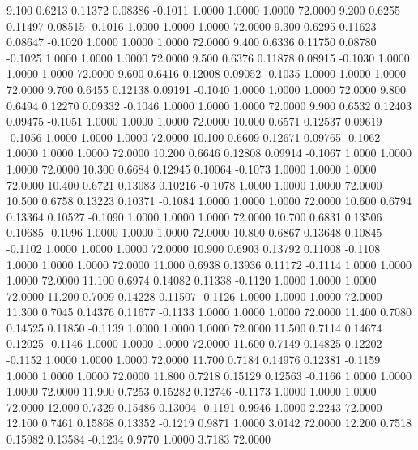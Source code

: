    9.100   0.6213   0.11372   0.08386  -0.1011   1.0000   1.0000   1.0000  72.0000
   9.200   0.6255   0.11497   0.08515  -0.1016   1.0000   1.0000   1.0000  72.0000
   9.300   0.6295   0.11623   0.08647  -0.1020   1.0000   1.0000   1.0000  72.0000
   9.400   0.6336   0.11750   0.08780  -0.1025   1.0000   1.0000   1.0000  72.0000
   9.500   0.6376   0.11878   0.08915  -0.1030   1.0000   1.0000   1.0000  72.0000
   9.600   0.6416   0.12008   0.09052  -0.1035   1.0000   1.0000   1.0000  72.0000
   9.700   0.6455   0.12138   0.09191  -0.1040   1.0000   1.0000   1.0000  72.0000
   9.800   0.6494   0.12270   0.09332  -0.1046   1.0000   1.0000   1.0000  72.0000
   9.900   0.6532   0.12403   0.09475  -0.1051   1.0000   1.0000   1.0000  72.0000
  10.000   0.6571   0.12537   0.09619  -0.1056   1.0000   1.0000   1.0000  72.0000
  10.100   0.6609   0.12671   0.09765  -0.1062   1.0000   1.0000   1.0000  72.0000
  10.200   0.6646   0.12808   0.09914  -0.1067   1.0000   1.0000   1.0000  72.0000
  10.300   0.6684   0.12945   0.10064  -0.1073   1.0000   1.0000   1.0000  72.0000
  10.400   0.6721   0.13083   0.10216  -0.1078   1.0000   1.0000   1.0000  72.0000
  10.500   0.6758   0.13223   0.10371  -0.1084   1.0000   1.0000   1.0000  72.0000
  10.600   0.6794   0.13364   0.10527  -0.1090   1.0000   1.0000   1.0000  72.0000
  10.700   0.6831   0.13506   0.10685  -0.1096   1.0000   1.0000   1.0000  72.0000
  10.800   0.6867   0.13648   0.10845  -0.1102   1.0000   1.0000   1.0000  72.0000
  10.900   0.6903   0.13792   0.11008  -0.1108   1.0000   1.0000   1.0000  72.0000
  11.000   0.6938   0.13936   0.11172  -0.1114   1.0000   1.0000   1.0000  72.0000
  11.100   0.6974   0.14082   0.11338  -0.1120   1.0000   1.0000   1.0000  72.0000
  11.200   0.7009   0.14228   0.11507  -0.1126   1.0000   1.0000   1.0000  72.0000
  11.300   0.7045   0.14376   0.11677  -0.1133   1.0000   1.0000   1.0000  72.0000
  11.400   0.7080   0.14525   0.11850  -0.1139   1.0000   1.0000   1.0000  72.0000
  11.500   0.7114   0.14674   0.12025  -0.1146   1.0000   1.0000   1.0000  72.0000
  11.600   0.7149   0.14825   0.12202  -0.1152   1.0000   1.0000   1.0000  72.0000
  11.700   0.7184   0.14976   0.12381  -0.1159   1.0000   1.0000   1.0000  72.0000
  11.800   0.7218   0.15129   0.12563  -0.1166   1.0000   1.0000   1.0000  72.0000
  11.900   0.7253   0.15282   0.12746  -0.1173   1.0000   1.0000   1.0000  72.0000
  12.000   0.7329   0.15486   0.13004  -0.1191   0.9946   1.0000   2.2243  72.0000
  12.100   0.7461   0.15868   0.13352  -0.1219   0.9871   1.0000   3.0142  72.0000
  12.200   0.7518   0.15982   0.13584  -0.1234   0.9770   1.0000   3.7183  72.0000
